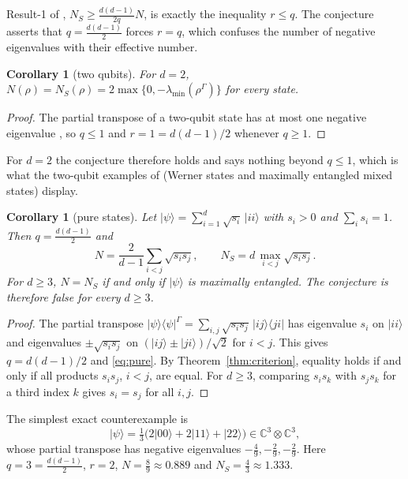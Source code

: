 \documentclass[11pt,a4paper]{article}
\newtheorem{corollary}[theorem]{Corollary}
\theoremstyle{definition}
\theoremstyle{plain}
\newcommand{\ket}[1]{\lvert#1\rangle}
\newcommand{\ketbra}[2]{\lvert#1\rangle\langle#2\rvert}
\newcommand{\C}{\mathbb{C}}
\newcommand{\NS}{N_{S}}
\newcommand{\G}{\Gamma}
\begin{document}
Result-1 of \cite{KumariAdhikari2022}, $\NS\ge\frac{d(d-1)}{2q}N$, is
exactly the inequality $r\le q$. The conjecture asserts that
$q=\frac{d(d-1)}{2}$ forces $r=q$, which confuses the number of negative
eigenvalues with their effective number.

\begin{corollary}[two qubits]\label{cor:qubits}
For $d=2$, $N(\rho)=\NS(\rho)=2\max\{0,-\lambda_{\min}(\rho^\G)\}$ for every
state.
\end{corollary}
\begin{proof}
The partial transpose of a two-qubit state has at most one negative eigenvalue
\cite{Rana2013}, so $q\le1$ and $r=1=d(d-1)/2$ whenever $q\ge1$.
\end{proof}

For $d=2$ the conjecture therefore holds and says nothing beyond $q\le1$,
which is what the two-qubit examples of \cite{KumariAdhikari2022} (Werner
states and maximally entangled mixed states) display.

\begin{corollary}[pure states]\label{cor:pure}
Let $\ket\psi=\sum_{i=1}^d\sqrt{s_i}\,\ket{ii}$ with $s_i>0$ and
$\sum_is_i=1$. Then $q=\frac{d(d-1)}{2}$ and
\begin{equation}\label{eq:pure}
N=\frac{2}{d-1}\sum_{i<j}\sqrt{s_is_j},\qquad
\NS=d\,\max_{i<j}\sqrt{s_is_j}.
\end{equation}
For $d\ge3$, $N=\NS$ if and only if $\ket\psi$ is maximally entangled. The
conjecture is therefore false for every $d\ge3$.
\end{corollary}
\begin{proof}
The partial transpose
$\ketbra\psi\psi^\G=\sum_{i,j}\sqrt{s_is_j}\,\ketbra{ij}{ji}$ has eigenvalue
$s_i$ on $\ket{ii}$ and eigenvalues $\pm\sqrt{s_is_j}$ on
$(\ket{ij}\pm\ket{ji})/\sqrt2$ for $i<j$. This gives $q=d(d-1)/2$ and
\eqref{eq:pure}. By Theorem~\ref{thm:criterion}, equality holds if and only if
all products $s_is_j$, $i<j$, are equal. For $d\ge3$, comparing $s_is_k$ with
$s_js_k$ for a third index $k$ gives $s_i=s_j$ for all $i,j$.
\end{proof}

The simplest exact counterexample is
\begin{equation}\label{eq:psi}
\ket\psi=\tfrac13\bigl(2\ket{00}+2\ket{11}+\ket{22}\bigr)\in\C^3\otimes\C^3,
\end{equation}
whose partial transpose has negative eigenvalues $-\frac49,-\frac29,-\frac29$.
Here $q=3=\frac{d(d-1)}2$, $r=2$, $N=\frac89\approx0.889$ and
$\NS=\frac43\approx1.333$.
\end{document}
